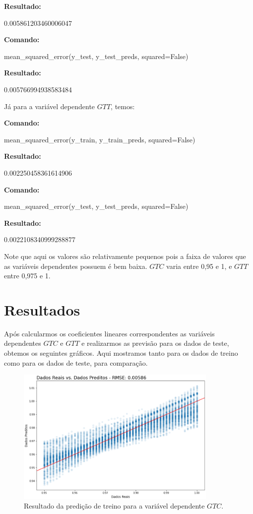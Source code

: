 \documentclass[a4paper, 12pt]{article}
\theoremstyle{definition}
\theoremstyle{remark}
\begin{document}
\textbf{Resultado:}
\begin{python}
0.005861203460006047
\end{python}


\textbf{Comando:}
\begin{python}
mean_squared_error(y_test, y_test_preds, squared=False)
\end{python}

\textbf{Resultado:}
\begin{python}
0.005766994938583484
\end{python}

Já para a variável dependente $GTT$, temos:

\textbf{Comando:}
\begin{python}
mean_squared_error(y_train, y_train_preds, squared=False)
\end{python}

\textbf{Resultado:}
\begin{python}
0.002250458361614906
\end{python}


\textbf{Comando:}
\begin{python}
mean_squared_error(y_test, y_test_preds, squared=False)
\end{python}

\textbf{Resultado:}
\begin{python}
0.0022108340999288877
\end{python}

Note que aqui os valores são relativamente pequenos pois a faixa de valores que as variáveis dependentes possuem é bem baixa. $GTC$ varia entre 0,95 e 1, e $GTT$ entre 0,975 e 1.
\newpage
\section{Resultados}

Após calcularmos os coeficientes lineares correspondentes as variáveis dependentes $GTC$ e $GTT$ e realizarmos as previsão para os dados de teste, obtemos os seguintes gráficos. Aqui mostramos tanto para os dados de treino como para os dados de teste, para comparação.

\begin{figure}[h]
  \centering
  \includegraphics[width=9.7cm]{treinoGT}
  \caption{Resultado da predição de treino para a variável dependente $GTC$.}
  \label{fig:treinoGT}
\end{figure}
\end{document}
